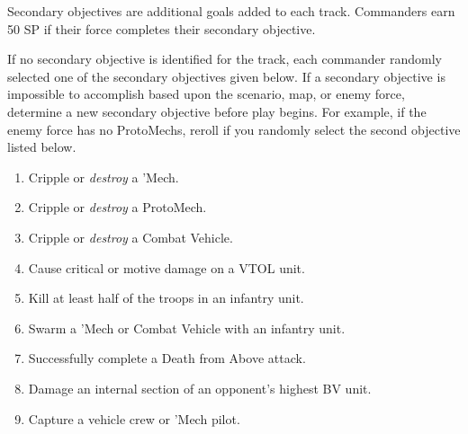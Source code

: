 Secondary objectives are additional goals added to each track.
Commanders earn 50 SP if their force completes their secondary objective.

If no secondary objective is identified for the track, each commander randomly selected one of the secondary objectives given below.
If a secondary objective is impossible to accomplish based upon the scenario, map, or enemy force, determine a new secondary objective before play begins.
For example, if the enemy force has no ProtoMechs, reroll if you randomly select the second objective listed below.

\begin{enumerate}

\item Cripple or \emph{destroy} a 'Mech.

\item Cripple or \emph{destroy} a ProtoMech.

\item Cripple or \emph{destroy} a Combat Vehicle.

\item Cause critical or motive damage on a VTOL unit.

\item Kill at least half of the troops in an infantry unit.

\item Swarm a 'Mech or Combat Vehicle with an infantry unit.

\item Successfully complete a Death from Above attack.

\item Damage an internal section of an opponent's highest BV unit.

\item Capture a vehicle crew or 'Mech pilot.

\end{enumerate}
